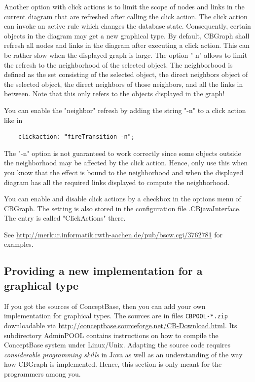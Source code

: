 \vspace{0.3cm}
Another option with click actions is to limit the scope of nodes and links in the current diagram
that are refreshed after calling the click action. The click action can invoke an
active rule which changes the database state. Consequently, certain objects in the diagram
may get a new graphical type. By default, CBGraph shall refresh all nodes and links in the diagram
after executing a click action. This can be rather slow when the displayed graph is large.
The option "-n" allows to limit the refresh to the neighborhood of the selected object.
The neighborbood is defined as the set consisting of the selected object, the direct neighbors object of the
selected object, the direct neighbors of those neighbors, and all the links in between. 
Note that this only refers to the objects displayed in the graph!

You can enable the "neighbor" refresh by adding the string "-n" to a click action like in

{\small
\begin{verbatim}
    clickaction: "fireTransition -n";
\end{verbatim}
}

The "-n" option is not guaranteed to work correctly since some objects outside the neighborhood
may be affected by the click action. Hence, only use this when you know that the effect is
bound to the neighborhood and when the displayed diagram has all the required links displayed
to compute the neighborhood. 

You can enable and disable click actions by a checkbox in the options menu of
CBGraph. The setting is also stored in the configuration file .CBjavaInterface.
The entry is called "ClickActions" there.

See
\url{http://merkur.informatik.rwth-aachen.de/pub/bscw.cgi/3762781}
for examples.


\subsection{Providing a new implementation for a graphical type}

If you got the sources of ConceptBase, then you can add your own implementation
for graphical types. The sources are in files {\tt CBPOOL-*.zip} downloadable via
\url{http://conceptbase.sourceforge.net/CB-Download.html}. Its subdirectory 
AdminPOOL contains instructions on how to compile the ConceptBase system under
Linux/Unix. Adapting the source code requires {\em considerable programming skills\/} in Java
as well as an understanding of the way how CBGraph is implemented.
Hence, this section is only meant for the programmers among you.

